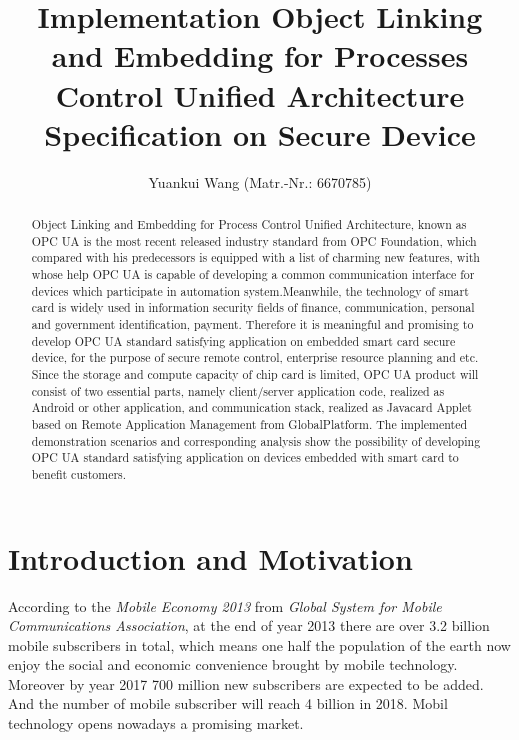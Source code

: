 \documentclass[]{llncs}
\begin{document}
\title{Implementation Object Linking and Embedding for Processes Control Unified Architecture Specification on Secure Device} %
\author{Yuankui Wang (Matr.-Nr.: 6670785)}

\maketitle

\begin{abstract}

Object Linking and Embedding for Process Control Unified Architecture, known as OPC UA is the most recent released industry standard from OPC Foundation, which compared with his predecessors is equipped with a list of charming new features, with whose help OPC UA is capable of developing a common communication interface for devices which participate in automation system.Meanwhile, the technology of smart card is widely used in information security fields of finance, communication, personal and government identification, payment. Therefore it is meaningful and promising to develop OPC UA standard satisfying application on embedded smart card secure device, for the purpose of secure remote control, enterprise resource planning and etc. Since the storage and compute capacity of chip card is limited, OPC UA product will consist of two essential parts, namely client/server application code, realized as Android or other application, and communication stack, realized as Javacard Applet based on Remote Application Management from GlobalPlatform. The implemented demonstration scenarios and corresponding analysis show the possibility of developing OPC UA standard satisfying application on devices embedded with smart card to benefit customers. 
\end{abstract}

\section{Introduction and Motivation}

According to the \emph{Mobile Economy 2013} from \emph{Global System for Mobile Communications Association}, at the end of year 2013 there are over 3.2 billion mobile   subscribers in total, which means one half the population of the earth now enjoy the social and economic convenience brought by mobile technology. Moreover by year 2017 700 million new subscribers are expected to be added. And the number of mobile subscriber will reach 4 billion in 2018. Mobil technology opens nowadays a promising market. 
\end{document}
